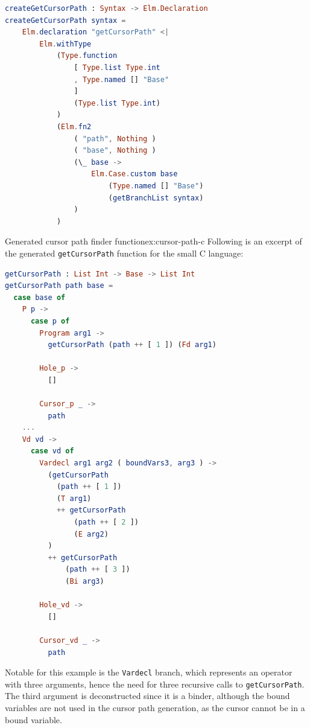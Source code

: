 \begin{minipage}{\textwidth}
  \begin{lstlisting}[language=elm,style=inline,caption={getCursorPath function generator},label={lst:cursor-path-fun-gen}]
createGetCursorPath : Syntax -> Elm.Declaration
createGetCursorPath syntax =
    Elm.declaration "getCursorPath" <|
        Elm.withType
            (Type.function
                [ Type.list Type.int
                , Type.named [] "Base"
                ]
                (Type.list Type.int)
            )
            (Elm.fn2
                ( "path", Nothing )
                ( "base", Nothing )
                (\_ base ->
                    Elm.Case.custom base
                        (Type.named [] "Base")
                        (getBranchList syntax)
                )
            )    
\end{lstlisting}
\end{minipage}

\begin{example}{Generated cursor path finder function}{ex:cursor-path-c}
  Following is an excerpt of the generated \texttt{getCursorPath} function
  for the small C language:
  \begin{lstlisting}[language=elm,style=inline,backgroundcolor=\color{myexamplecolorback}]
getCursorPath : List Int -> Base -> List Int
getCursorPath path base =
  case base of
    P p ->
      case p of
        Program arg1 ->
          getCursorPath (path ++ [ 1 ]) (Fd arg1)

        Hole_p ->
          []

        Cursor_p _ ->
          path
    ...
    Vd vd ->
      case vd of
        Vardecl arg1 arg2 ( boundVars3, arg3 ) ->
          (getCursorPath
            (path ++ [ 1 ])
            (T arg1)
            ++ getCursorPath
                (path ++ [ 2 ])
                (E arg2)
          )
          ++ getCursorPath
              (path ++ [ 3 ])
              (Bi arg3)

        Hole_vd ->
          []

        Cursor_vd _ ->
          path
\end{lstlisting}

  Notable for this example is the \texttt{Vardecl} branch, which represents an
  operator with three arguments, hence the need for three recursive calls to
  \texttt{getCursorPath}. The third argument is deconstructed since it is a binder,
  although the bound variables are not used in the cursor path generation,
  as the cursor cannot be in a bound variable.

\end{example}


